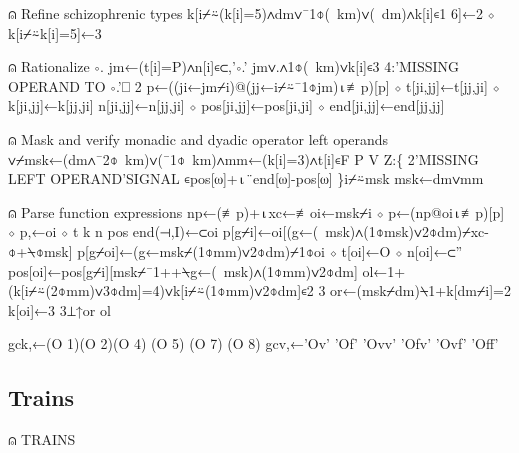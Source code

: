 \documentclass{article}%
\begin{document}
⍝ Refine schizophrenic types
k[i⌿⍨(k[i]=5)∧dm∨¯1⌽(~km)∨(~dm)∧k[i]∊1 6]←2 ⋄ k[i⌿⍨k[i]=5]←3

⍝ Rationalize ∘.
jm←(t[i]=P)∧n[i]∊⊂,'∘.'
jm∨.∧1⌽(~km)∨k[i]∊3 4:'MISSING OPERAND TO ∘.'⎕ 2
p←((ji←jm⌿i)@(jj←i⌿⍨¯1⌽jm)⍳≢p)[p] ⋄ t[ji,jj]←t[jj,ji] ⋄ k[ji,jj]←k[jj,ji]
n[ji,jj]←n[jj,ji] ⋄ pos[ji,jj]←pos[ji,ji] ⋄ end[ji,jj]←end[jj,jj]

⍝ Mask and verify monadic and dyadic operator left operands
∨⌿msk←(dm∧¯2⌽~km)∨(¯1⌽~km)∧mm←(k[i]=3)∧t[i]∊F P V Z:\{
        2'MISSING LEFT OPERAND'SIGNAL ∊pos[⍵]+⍳¨end[⍵]-pos[⍵]
\}i⌿⍨msk
msk←dm∨mm

⍝ Parse function expressions
np←(≢p)+⍳xc←≢oi←msk⌿i ⋄ p←(np@oi⍳≢p)[p] ⋄ p,←oi ⋄ t k n pos end(⊣,I)←⊂oi
p[g⌿i]←oi[(g←(~msk)∧(1⌽msk)∨2⌽dm)⌿xc-⌽+⍀⌽msk]
p[g⌿oi]←(g←msk⌿(1⌽mm)∨2⌽dm)⌿1⌽oi ⋄ t[oi]←O ⋄ n[oi]←⊂''
pos[oi]←pos[g⌿i][msk⌿¯1++⍀g←(~msk)∧(1⌽mm)∨2⌽dm]
ol←1+(k[i⌿⍨(2⌽mm)∨3⌽dm]=4)∨k[i⌿⍨(1⌽mm)∨2⌽dm]∊2 3
or←(msk⌿dm)⍀1+k[dm⌿i]=2
k[oi]←3 3⊥↑or ol
\nwendcode{}\nwdocspar

\nwenddocs{}\plusendmoddef\nwstartdeflinemarkup{}\nwenddeflinemarkup
gck,←(O 1)(O 2)(O 4) (O 5) (O 7) (O 8)
gcv,←'Ov' 'Of' 'Ovv' 'Ofv' 'Ovf' 'Off'
\nwendcode{}\nwdocspar

\subsection{Trains}

\nwenddocs{}\endmoddef\nwstartdeflinemarkup{}\nwenddeflinemarkup
⍝ TRAINS
\nwendcode{}\nwdocspar
\end{document}
